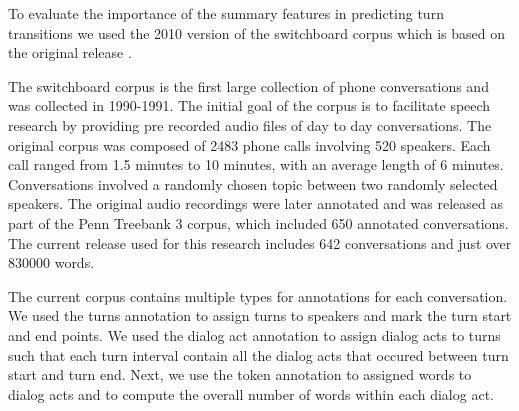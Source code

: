 To evaluate the importance of the summary features in predicting turn transitions we used the 2010 version of the switchboard corpus \cite{calhoun2010nxt} which is based on the original release \cite{225858}.

The switchboard corpus is the first large collection of phone conversations and was collected in 1990-1991. The initial goal of the corpus is to facilitate speech research by providing pre recorded audio files of day to day conversations. The original corpus was composed of 2483 phone calls involving 520 speakers. Each call ranged from 1.5 minutes to 10 minutes, with an average length of 6 minutes. Conversations involved a randomly chosen topic between two randomly selected speakers. The original audio recordings were later annotated and was released as part of the Penn Treebank 3 corpus, which included 650 annotated conversations. The current release used for this research includes 642 conversations and just over 830000 words.

The current corpus contains multiple types for annotations for each conversation. We used the turns annotation to assign turns to speakers and mark the turn start and end points. We used the dialog act annotation to assign dialog acts to turns such that each turn interval contain all the dialog acts that occured between turn start and turn end. Next, we use the token annotation to assigned words to dialog acts and to compute the overall number of words within each dialog act.
